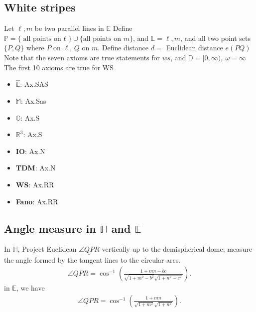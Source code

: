 \documentclass{report}
\begin{document}
    \bigbreak \noindent 
    \subsection{White stripes}
    \bigbreak \noindent 
    Let $\ell, m$ be two parallel lines in $\mathbb{E}$
    \bigbreak \noindent 
    Define $\mathbb{P} = \{\text{all points on $\ell $}\} \cup \{\text{all points on $m$}\}$, and $\mathbb{L} = \ell,m$, and all two point sets $\{P,Q\}$ where $P$ on $\ell$, $Q$ on $m$. Define distance $d = $ Euclidean distance $e(PQ)$
    \bigbreak \noindent 
    Note that the seven axioms are true statements for $ws$, and $\mathbb{D} = [0,\infty),\ \omega = \infty$
    \bigbreak \noindent 
    The first 10 axioms are true for WS






    \pagebreak 
    \begin{itemize}
        \item \textbf{$\mathbb{\hat{E}}$}: Ax.SAS
        \item \textbf{$\mathbb{M}$}: Ax.Sas
        \item \textbf{$\mathbb{G}$}: Ax.S
        \item \textbf{$\mathbb{R}^{3}$}: Ax.S
        \item \textbf{IO}: Ax.N
        \item \textbf{TDM}: Ax.N
        \item \textbf{WS}: Ax.RR
        \item \textbf{Fano}: Ax.RR
    \end{itemize}

    \pagebreak 
    \bigbreak \noindent 
    \subsection{Angle measure in $\mathbb{H}$ and $\mathbb{E}$}
    \bigbreak \noindent 
    In $\mathbb{H}$, Project Euclidean $\underline{\angle QPR}$ vertically up to the demispherical dome; measure the angle formed by the tangent lines to the circular arcs.
    \bigbreak \noindent 
    \begin{align*}
        \angle QPR = \cos^{-1}{\left(\frac{1+mn-bc}{\sqrt{1+m^{2}-b^{2}}\sqrt{1+n^{2}-c^{2}}}\right)}
    .\end{align*}
    \bigbreak \noindent 
    in $\mathbb{E}$, we have
    \begin{align*}
        \angle QPR = \cos^{-1}{\left(\frac{1+mn}{\sqrt{1+m^{2}}\sqrt{1+n^{2}}}\right)}
    .\end{align*}
\end{document}
